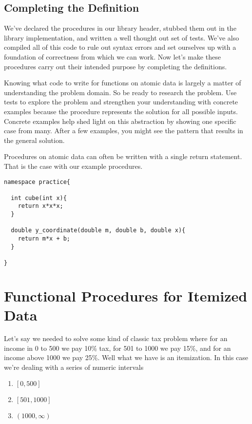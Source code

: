 \documentclass[]{tufte-handout}
\begin{document}
\subsection{Completing the Definition}

We've declared the procedures in our library header, stubbed them out in the library implementation, and written a well thought out set of tests. We've also compiled all of this code to rule out syntax errors and set ourselves up with a foundation of correctness from which we can work.  Now let's make these procedures carry out their intended purpose by completing the definitions.

Knowing what code to write for functions on atomic data is largely a matter of understanding the problem domain. So be ready to research the problem. Use tests to explore the problem and strengthen your understanding with concrete examples because the procedure represents the solution for all possible inputs. Concrete examples help shed light on this abstraction by showing one specific case from many. After a few examples, you might see the pattern that results in the general solution. 

Procedures on atomic data can often be written with a single return statement. That is the case with our example procedures.

\begin{verbatim}
namespace practice{

  int cube(int x){
    return x*x*x;  
  }

  double y_coordinate(double m, double b, double x){
    return m*x + b;
  }

}
\end{verbatim}


\section{Functional Procedures for Itemized Data}

Let's say we needed to solve some kind of classic tax problem where for an income in 0 to 500 we pay 10\% tax, for 501 to 1000 we pay 15\%, and for an income above 1000 we pay 25\%. Well what we have is an itemization. In this case we're dealing with a series of numeric intervals
\begin{enumerate}
\item $[0,500]$
\item $[501,1000]$
\item $(1000,\infty)$
\end{enumerate}
\end{document}
